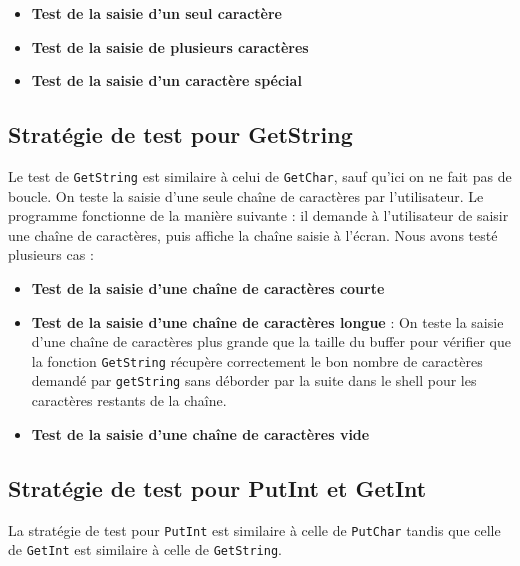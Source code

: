 \documentclass[a4paper,11pt]{article}
\begin{document}
\begin{itemize}
    \item \textbf{Test de la saisie d'un seul caractère}
    \item \textbf{Test de la saisie de plusieurs caractères} 
    \item \textbf{Test de la saisie d'un caractère spécial} 
\end{itemize}


\subsection{Stratégie de test pour GetString}

Le test de \texttt{GetString} est similaire à celui de \texttt{GetChar}, sauf qu'ici on ne fait pas de boucle. 
On teste la saisie d'une seule chaîne de caractères par l'utilisateur.
Le programme fonctionne de la manière suivante : il demande à l'utilisateur de saisir une chaîne de caractères, puis affiche la chaîne saisie à l'écran.
Nous avons testé plusieurs cas :

\begin{itemize}
    \item \textbf{Test de la saisie d'une chaîne de caractères courte} 
    \item \textbf{Test de la saisie d'une chaîne de caractères longue} : On teste la saisie d'une chaîne de caractères plus grande que la taille du buffer pour vérifier que la fonction \texttt{GetString} récupère correctement le bon nombre de caractères demandé par \texttt{getString} sans déborder par la suite dans le shell pour les caractères restants de la chaîne.
    \item \textbf{Test de la saisie d'une chaîne de caractères vide}
\end{itemize}

\subsection{Stratégie de test pour PutInt et GetInt}

La stratégie de test pour \texttt{PutInt} est similaire à celle de \texttt{PutChar} tandis que celle de \texttt{GetInt} est similaire à celle de \texttt{GetString}.




\end{document}
